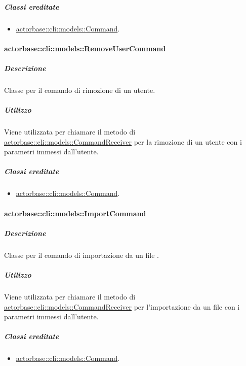 \documentclass{scalatekids-article}
\begin{document}
\subparagraph{Classi ereditate}

\begin{itemize}
\item \hyperref[sec:actorbase::cli::models::Command]{actorbase::cli::models::Command}.
\end{itemize}

\paragraph{actorbase::cli::models::RemoveUserCommand}
\label{sec:actorbase::cli::models::RemoveUserCommand}

\subparagraph{Descrizione}

Classe per il comando di rimozione di un utente.

\subparagraph{Utilizzo}

Viene utilizzata per chiamare il metodo di
\hyperref[sec:actorbase::cli::models::CommandReceiver]{actorbase::cli::models::CommandReceiver} per la rimozione di un utente con i
parametri immessi dall'utente.

\subparagraph{Classi ereditate}

\begin{itemize}
\item \hyperref[sec:actorbase::cli::models::Command]{actorbase::cli::models::Command}.
\end{itemize}

\paragraph{actorbase::cli::models::ImportCommand}
\label{sec:actorbase::cli::models::ImportCommand}

\subparagraph{Descrizione}

Classe per il comando di importazione da un file .

\subparagraph{Utilizzo}

Viene utilizzata per chiamare il metodo di
\hyperref[sec:actorbase::cli::models::CommandReceiver]{actorbase::cli::models::CommandReceiver} per l'importazione da un file
 con i parametri immessi dall'utente.

\subparagraph{Classi ereditate}

\begin{itemize}
\item \hyperref[sec:actorbase::cli::models::Command]{actorbase::cli::models::Command}.
\end{itemize}
\end{document}
